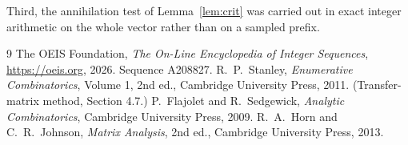 \documentclass[11pt,a4paper]{article}
\theoremstyle{plain}
\theoremstyle{definition}
\begin{document}
Third, the annihilation test of Lemma~\ref{lem:crit} was carried out in exact integer
arithmetic on the whole vector rather than on a sampled prefix.

\begin{thebibliography}{9}
 The OEIS Foundation, \emph{The On-Line Encyclopedia of Integer
Sequences}, \url{https://oeis.org}, 2026. Sequence A208827.
 R.~P.~Stanley, \emph{Enumerative Combinatorics}, Volume 1, 2nd ed.,
Cambridge University Press, 2011. (Transfer-matrix method, Section 4.7.)
 P.~Flajolet and R.~Sedgewick, \emph{Analytic Combinatorics}, Cambridge
University Press, 2009.
 R.~A.~Horn and C.~R.~Johnson, \emph{Matrix Analysis}, 2nd ed., Cambridge
University Press, 2013.
\end{thebibliography}
\end{document}
